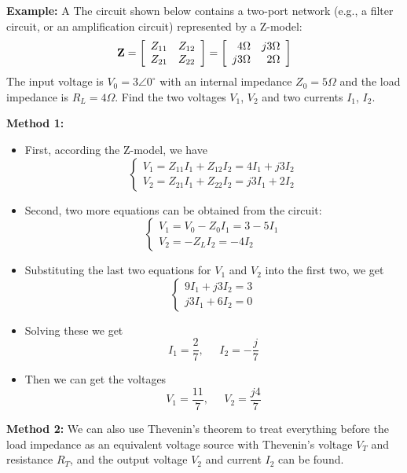 
{\bf Example:} A The circuit shown below contains a two-port network (e.g., a 
filter circuit, or an amplification circuit) represented by a Z-model:
\[ {\bf Z}=\left[\begin{array}{ll} Z_{11} & Z_{12} \\ 
	Z_{21} & Z_{22} \end{array}\right]
	=\left[\begin{array}{rr} 4\Omega & j3\Omega \\ 
	j3\Omega & 2\Omega \end{array}\right]	\]
The input voltage is $V_0=3\angle 0^\circ$ with an internal impedance 
$Z_0=5\Omega$ and the load impedance is $R_L=4\Omega$. Find the two voltages 
$V_1$, $V_2$ and two currents $I_1$, $I_2$.


{\bf Method 1:} 
\begin{itemize}
\item First, according the Z-model, we have
\[ \left\{ \begin{array}{l} V_1=Z_{11}I_1+Z_{12}I_2= 4I_1+j3I_2 \\
	V_2=Z_{21}I_1+Z_{22}I_2=j3I_1+ 2I_2 \end{array} \right.	\]
\item Second, two more equations can be obtained from the circuit:
\[ \left\{ \begin{array}{l} V_1=V_0-Z_0 I_1=3-5I_1 \\
	V_2=-Z_L I_2=-4 I_2 \end{array} \right.	\]
\item Substituting the last two equations for $V_1$ and $V_2$ into the 
	first two, we get
\[ \left\{ \begin{array}{l} 9I_1+j3I_2=3 \\ j3I_1+6I_2=0 \end{array} \right. \]
\item Solving these we get 
\[	I_1=\frac{2}{7},\;\;\;\;\;I_2=-\frac{j}{7} \]
\item Then we can get the voltages
\[	V_1=\frac{11}{7},\;\;\;\;\;V_2=\frac{j4}{7} \]
\end{itemize}

{\bf Method 2:} We can also use Thevenin's theorem to treat everything before
the load impedance as an equivalent voltage source with Thevenin's voltage
$V_T$ and resistance $R_T$, and the output voltage $V_2$ and current 
$I_2$ can be found.

